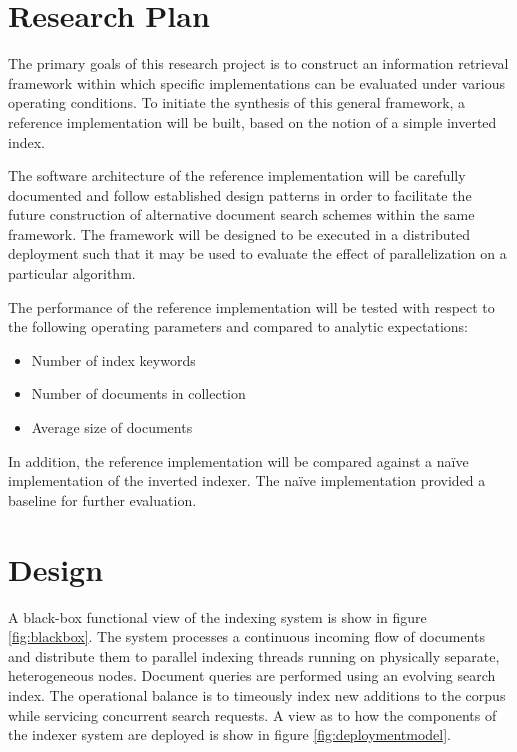 \documentclass[10pt]{report}
\begin{document}
\section{Research Plan}
\label{sec:researchplan}
The primary goals of this research project is to construct an
information retrieval framework within which specific implementations
can be evaluated under various operating conditions. To initiate the
synthesis of this general framework, a reference implementation will
be built, based on the notion of a simple inverted index.

The software architecture of the reference implementation will be
carefully documented and follow established design patterns in order
to facilitate the future construction of alternative document search
schemes within the same framework. The framework will be designed to
be executed in a distributed deployment such that it may be used to
evaluate the effect of parallelization on a particular algorithm.

The performance of the reference implementation will be tested with
respect to the following operating parameters and compared to analytic
expectations:

\begin{itemize}
\item Number of index keywords
\item Number of documents in collection
\item Average size of documents
\end{itemize}

In addition, the reference implementation will be compared against a
na\"{i}ve implementation of the inverted indexer. The na\"{i}ve
implementation provided a baseline for further evaluation.


\section{Design}
\label{sec:design}
A black-box functional view of the indexing system is show in figure
\ref{fig:blackbox}. The system processes a continuous incoming flow of
documents and distribute them to parallel indexing threads running on
physically separate, heterogeneous nodes.  Document queries are performed
using an evolving search index. The operational balance is to
timeously index new additions to the corpus while servicing concurrent
search requests. A view as to how the components of the indexer system
are deployed is show in figure \ref{fig:deploymentmodel}.
\end{document}
